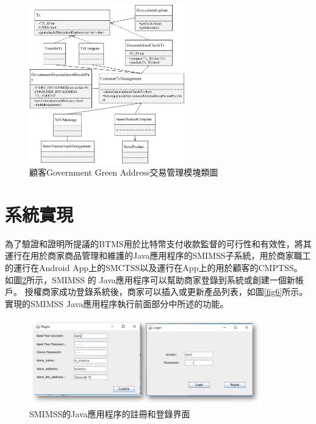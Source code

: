 	\begin{figure}[!htbp]
		\centering
		\includegraphics[width = 0.6\textwidth]{c6.jpg}
		\caption{顧客Government Green Address交易管理模塊類圖}\label{c6}
	\end{figure}

\section{系統實現}


為了驗證和證明所提議的BTMS用於比特幣支付收款監督的可行性和有效性，將其運行在用於商家商品管理和維護的Java應用程序的SMIMSS子系統，用於商家職工的運行在Android App上的SMCTSS以及運行在App上的用於顧客的CMPTSS。
如圖\ref{fig5}所示，SMIMSS 的 Java應用程序可以幫助商家登錄到系統或創建一個新帳戶。 授權商家成功登錄系統後，商家可以插入或更新產品列表，如圖\ref{fig6}所示。實現的SMIMSS Java應用程序執行前面部分中所述的功能。

\begin{figure}[!htbp]
	\centering
	\includegraphics[width = 0.9\textwidth]{fig5.png}
	\caption{SMIMSS的Java應用程序的註冊和登錄界面}\label{fig5}
\end{figure}

